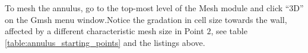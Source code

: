 \lstset{numbers=none}
\par
To mesh the annulus, go to the top-most level of the Mesh module and click ``3D'' on the Gmsh menu
window.Notice the gradation in cell size towards the wall, affected by a different characteristic mesh size in
Point $2$, see table \ref{table:annulus_starting_points} and the listings above.
